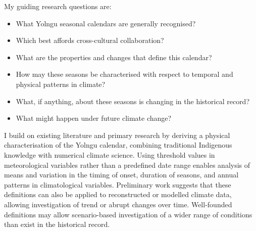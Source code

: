 My guiding research questions are:
\begin{itemize}
\item What Yolngu seasonal calendars are generally recognised?
\item Which best affords cross-cultural collaboration?
\item What are the properties and changes that define this calendar?
\item How may these seasons be characterised with respect to temporal and physical patterns in climate?
\item What, if anything, about these seasons is changing in the historical record?
\item What might happen under future climate change?
\end{itemize}

I build on existing literature and primary research by deriving a physical characterisation of the Yolngu calendar,
combining traditional Indigenous knowledge with numerical climate science.
Using threshold values in meteorological variables rather than a predefined date range enables
analysis of means and variation in the timing of onset, duration of seasons, and annual patterns in climatological variables.
Preliminary work suggests that these definitions can also be applied to reconstructed or modelled climate data,
allowing investigation of trend or abrupt changes over time.
Well-founded definitions may allow scenario-based investigation of a wider range of conditions than exist in the historical record.



